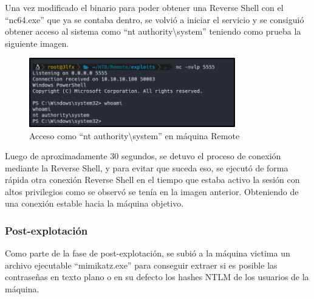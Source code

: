 Una vez modificado el binario para poder obtener una Reverse Shell con el “nc64.exe” que ya se contaba dentro, se volvió a iniciar el servicio y se consiguió obtener acceso al sistema como “nt authority\textbackslash{}system” teniendo como prueba la siguiente imagen.
\begin{figure}[H]
    \centering
    \includegraphics[width=0.8\textwidth]{imagenes/acntrem.png}
    \caption{Acceso como ``nt authority\textbackslash{}system'' en máquina Remote}
\end{figure}
Luego de aproximadamente 30 segundos, se detuvo el proceso de conexión mediante la Reverse Shell, y para evitar que suceda eso, se ejecutó de forma rápida otra conexión Reverse Shell en el tiempo que estaba activo la sesión con altos privilegios como se observó se tenía en la imagen anterior. Obteniendo de una conexión estable hacia la máquina objetivo.
\subsubsection{Post-explotación}
Como parte de la fase de post-explotación, se subió a la máquina victima un archivo ejecutable “mimikatz.exe” \cite{mimikatz} para conseguir extraer si es posible las contraseñas en texto plano o en su defecto los hashes NTLM de los usuarios de la máquina.

